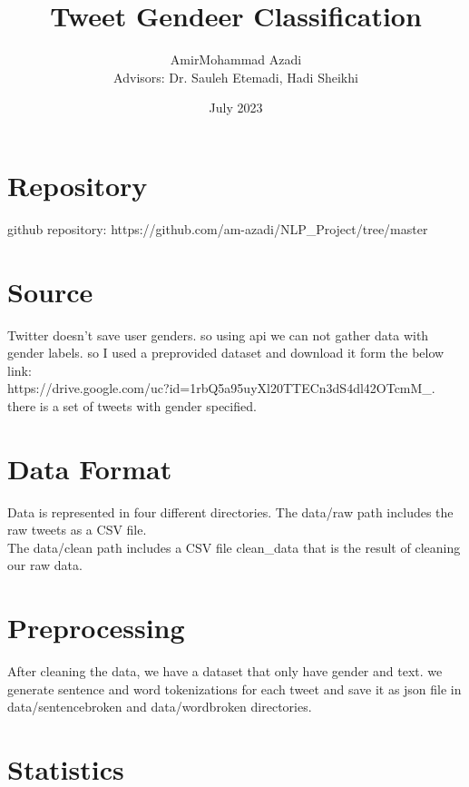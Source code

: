 \documentclass[rnd]{extarticle}
\begin{document}
  

	\title{Tweet Gendeer Classification}

	\author{AmirMohammad Azadi\\[0.2cm]{\small Advisors: Dr. Sauleh Etemadi, Hadi Sheikhi}}

	\date{July 2023}
	
	\maketitle

	\pagestyle{plain}
	
    \section{Repository}
		github repository: https://github.com/am-azadi/NLP_Project/tree/master
	
	\section{Source}
		Twitter doesn't save user genders. so using api we can not gather data with gender labels. so I used a preprovided dataset and download it form the below link:\\
        https://drive.google.com/uc?id=1rbQ5a95uyXl20TTECn3dS4dl42OTcmM_.\\
        there is a set of tweets with gender specified.\\

	\section{Data Format}
		Data is represented in four different directories. The data/raw path includes the raw tweets as a CSV file.\\
		The data/clean path includes a CSV file clean\_data that is the result of cleaning our raw data.\\
		
	\section{Preprocessing}
		After cleaning the data, we have a dataset that only have gender and text. we generate sentence and word tokenizations for each tweet and save it as json file in data/sentencebroken and data/wordbroken directories.\\
			
	\section{Statistics}
		
\end{document}
